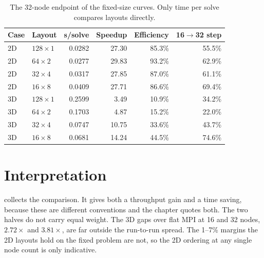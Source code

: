 \documentclass[12pt,a4paper,notitlepage]{report}
\begin{document}
\begin{table}[htbp]
  \centering
  \caption{The 32-node endpoint of the fixed-size curves. Only time per solve compares layouts
  directly.}
  \label{tab:strong20m-endpoints}
  \begin{tabular}{llrrrr}
    \toprule
    Case & Layout & s/solve & Speedup & Efficiency & 16$\to$32 step \\
    \midrule
    2D & $128\times1$ & 0.0282 & 27.30 & 85.3\% & 55.5\% \\
    2D & $64\times2$  & 0.0277 & 29.83 & 93.2\% & 62.9\% \\
    2D & $32\times4$  & 0.0317 & 27.85 & 87.0\% & 61.1\% \\
    2D & $16\times8$  & 0.0409 & 27.71 & 86.6\% & 69.4\% \\
    \addlinespace
    3D & $128\times1$ & 0.2599 &  3.49 & 10.9\% & 34.2\% \\
    3D & $64\times2$  & 0.1703 &  4.87 & 15.2\% & 22.0\% \\
    3D & $32\times4$  & 0.0747 & 10.75 & 33.6\% & 43.7\% \\
    3D & $16\times8$  & 0.0681 & 14.24 & 44.5\% & 74.6\% \\
    \bottomrule
  \end{tabular}
\end{table}

\section{Interpretation}
\label{sec:mn-interp}
 collects the comparison. It gives both a throughput gain and
a time saving, because these are different conventions and the chapter quotes both. The
two halves do not carry equal weight. The 3D gaps over flat MPI at 16 and 32 nodes, $2.72\times$ and $3.81\times$, are
far outside the run-to-run spread. The 1--7\% margins the 2D layouts hold on the fixed
problem are not, so the 2D ordering at any single node count is only indicative.
\end{document}
